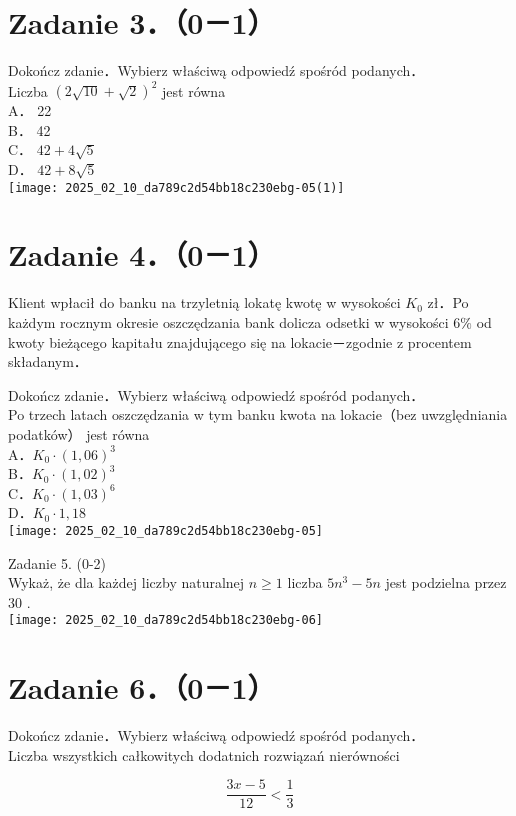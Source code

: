 \documentclass[10pt]{article}
\begin{document}
\section*{Zadanie 3．（0－1）}
Dokończ zdanie．Wybierz właściwą odpowiedź spośród podanych．\\
Liczba \((2 \sqrt{10}+\sqrt{2})^{2}\) jest równa\\
A． 22\\
B． 42\\
C． \(42+4 \sqrt{5}\)\\
D． \(42+8 \sqrt{5}\)\\
\texttt{[image: 2025\_02\_10\_da789c2d54bb18c230ebg-05(1)]}

\section*{Zadanie 4．（0－1）}
Klient wpłacił do banku na trzyletnią lokatę kwotę w wysokości \(K_{0}\) zł．Po każdym rocznym okresie oszczędzania bank dolicza odsetki w wysokości \(6 \%\) od kwoty bieżącego kapitału znajdującego się na lokacie－zgodnie z procentem składanym．

Dokończ zdanie．Wybierz właściwą odpowiedź spośród podanych．\\
Po trzech latach oszczędzania w tym banku kwota na lokacie（bez uwzględniania podatków） jest równa\\
A．\(K_{0} \cdot(1,06)^{3}\)\\
B．\(K_{0} \cdot(1,02)^{3}\)\\
C．\(K_{0} \cdot(1,03)^{6}\)\\
D．\(K_{0} \cdot 1,18\)\\
\texttt{[image: 2025\_02\_10\_da789c2d54bb18c230ebg-05]}

Zadanie 5. (0-2)\\
Wykaż, że dla każdej liczby naturalnej \(n \geq 1\) liczba \(5 n^{3}-5 n\) jest podzielna przez 30 .\\
\texttt{[image: 2025\_02\_10\_da789c2d54bb18c230ebg-06]}

\section*{Zadanie 6．（0－1）}
Dokończ zdanie．Wybierz właściwą odpowiedź spośród podanych．\\
Liczba wszystkich całkowitych dodatnich rozwiązań nierówności

\[
\frac{3 x-5}{12}<\frac{1}{3}
\]
\end{document}
